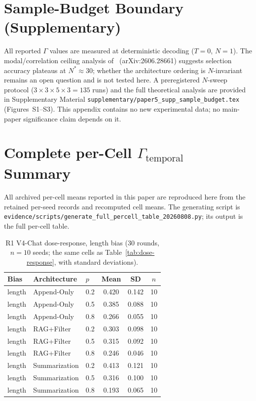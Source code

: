 \documentclass[11pt]{article}
\begin{document}
\section{Sample-Budget Boundary (Supplementary)}
\label{sec:supp-sample-budget}

All reported $\Gamma$ values are measured at deterministic decoding ($T{=}0$, $N{=}1$). The modal/correlation ceiling analysis of~\cite{bay2026sampling} (arXiv:2606.28661) suggests selection accuracy plateaus at $N^*{\approx}30$; whether the architecture ordering is $N$-invariant remains an open question and is not tested here. A preregistered $N$-sweep protocol ($3{\times}3{\times}5{\times}3{=}135$ runs) and the full theoretical analysis are provided in Supplementary Material \texttt{supplementary/paper5\_supp\_sample\_budget.tex} (Figures~S1--S3). This appendix contains no new experimental data; no main-paper significance claim depends on it.





\section{Complete per-Cell $\Gamma_{\text{temporal}}$ Summary}
\label{sec:supp-full-percell}
All archived per-cell means reported in this paper are reproduced here from the retained per-seed records and recomputed cell means. The generating script is \texttt{evidence/scripts/generate\_full\_percell\_table\_20260808.py}; its output is the full per-cell table.

\begin{table}[htbp]
\centering
\caption{R1 V4-Chat dose-response, length bias (30 rounds, $n{=}10$ seeds; the same cells as Table~\ref{tab:dose-response}, with standard deviations).}
\label{tab:supp-full-r1}
\small
\begin{tabular}{lllccc}
\toprule
Bias & Architecture & $p$ & Mean & SD & $n$ \\
\midrule
length & Append-Only & 0.2 & 0.420 & 0.142 & 10 \\
length & Append-Only & 0.5 & 0.385 & 0.088 & 10 \\
length & Append-Only & 0.8 & 0.266 & 0.055 & 10 \\
length & RAG+Filter & 0.2 & 0.303 & 0.098 & 10 \\
length & RAG+Filter & 0.5 & 0.315 & 0.092 & 10 \\
length & RAG+Filter & 0.8 & 0.246 & 0.046 & 10 \\
length & Summarization & 0.2 & 0.413 & 0.121 & 10 \\
length & Summarization & 0.5 & 0.316 & 0.100 & 10 \\
length & Summarization & 0.8 & 0.193 & 0.065 & 10 \\
\bottomrule
\end{tabular}
\end{table}
\end{document}
